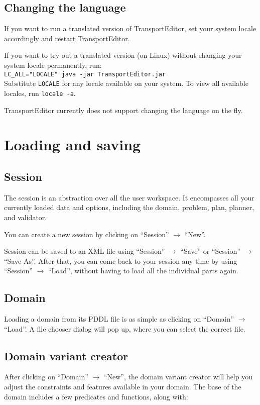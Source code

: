 \documentclass[12pt,a4paper,twoside]{article}
\begin{document}
\subsection{Changing the language}
If you want to run a translated version of TransportEditor,
set your system locale accordingly and restart TransportEditor.

If you want to try out a translated version (on Linux) without changing your system locale permanently,
run:\\
\verb+LC_ALL="LOCALE" java -jar TransportEditor.jar+\\
Substitute \texttt{LOCALE} for any locale available on your system. To view all available locales,
run \verb+locale -a+.

TransportEditor currently does not support changing the language on the fly.

\section{Loading and saving}
\subsection{Session}
The session is an abstraction over all the user workspace. It encompasses all your currently loaded data and options,
including the domain, problem, plan, planner, and validator.

You can create a new session by clicking on ``Session'' $\to$ ``New''.

Session can be saved to an XML file using ``Session'' $\to$ ``Save'' or ``Session'' $\to$ ``Save As''.
After that, you can come back to your session any time by using ``Session'' $\to$ ``Load'', without
having to load all the individual parts again.

\subsection{Domain}
Loading a domain from its PDDL file is as simple as clicking on ``Domain'' $\to$ ``Load''.
A file chooser dialog will pop up, where you can select the correct file.

\subsection{Domain variant creator}
After clicking on ``Domain'' $\to$ ``New'', the domain variant creator will help
you adjust the constraints and features available in your domain.
The base of the domain includes a few predicates and functions, along with:
\end{document}

